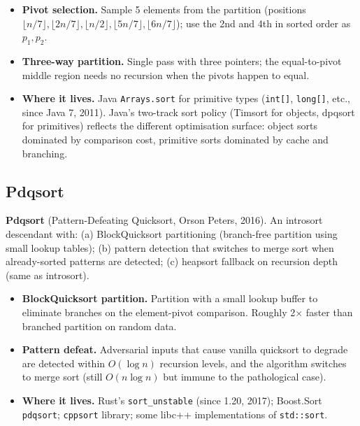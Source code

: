 \documentclass[11pt]{article}
\begin{document}
\begin{itemize}[leftmargin=*]
    \item \textbf{Pivot selection.} Sample 5 elements from the
          partition (positions
          $\lfloor n/7 \rfloor, \lfloor 2n/7 \rfloor, \lfloor n/2 \rfloor,
          \lfloor 5n/7 \rfloor, \lfloor 6n/7 \rfloor$); use the
          2nd and 4th in sorted order as $p_1, p_2$.
    \item \textbf{Three-way partition.} Single pass with three
          pointers; the equal-to-pivot middle region needs no
          recursion when the pivots happen to equal.
    \item \textbf{Where it lives.} Java \texttt{Arrays.sort}
          for primitive types (\texttt{int[]}, \texttt{long[]},
          etc., since Java 7, 2011). Java's two-track sort
          policy (Timsort for objects, dpqsort for primitives)
          reflects the different optimisation surface: object
          sorts dominated by comparison cost, primitive sorts
          dominated by cache and branching.
\end{itemize}

\subsection*{Pdqsort}

\begin{defnbox}
\textbf{Pdqsort} (Pattern-Defeating Quicksort, Orson Peters,
2016). An introsort descendant with: (a) BlockQuicksort
partitioning (branch-free partition using small lookup tables);
(b) pattern detection that switches to merge sort when
already-sorted patterns are detected; (c) heapsort fallback on
recursion depth (same as introsort).
\end{defnbox}

\begin{itemize}[leftmargin=*]
    \item \textbf{BlockQuicksort partition.} Partition with
          a small lookup buffer to eliminate branches on the
          element-pivot comparison. Roughly 2$\times$ faster
          than branched partition on random data.
    \item \textbf{Pattern defeat.} Adversarial inputs that
          cause vanilla quicksort to degrade are detected
          within $O(\log n)$ recursion levels, and the algorithm
          switches to merge sort (still $O(n \log n)$ but
          immune to the pathological case).
    \item \textbf{Where it lives.} Rust's
          \texttt{sort\_unstable} (since 1.20, 2017);
          Boost.Sort \texttt{pdqsort}; \texttt{cppsort} library;
          some libc++ implementations of \texttt{std::sort}.
\end{itemize}
\end{document}
